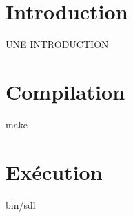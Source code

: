 \hypertarget{index_Introduction}{}\section{Introduction}\label{index_Introduction}
U\+NE I\+N\+T\+R\+O\+D\+U\+C\+T\+I\+ON \hypertarget{index_Compilation}{}\section{Compilation}\label{index_Compilation}
make \hypertarget{index_Exécution}{}\section{Exécution}\label{index_Exécution}
bin/sdl 